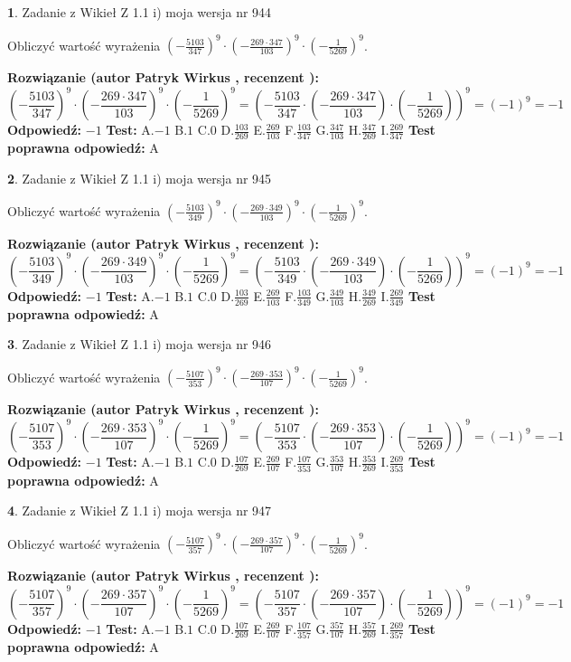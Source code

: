 \documentclass[12pt, a4paper]{article}
\theoremstyle{definition} %
\newtheorem{zad}{}
\newcommand{\zadStart}[1]{\begin{zad}#1\newline}
\newcommand{\zadStop}{\end{zad}}
\newcommand{\rozwStart}[2]{\noindent \textbf{Rozwiązanie (autor #1 , recenzent #2): }\newline}
\newcommand{\rozwStop}{\newline}
\newcommand{\odpStart}{\noindent \textbf{Odpowiedź:}\newline}
\newcommand{\odpStop}{\newline}
\newcommand{\testStart}{\noindent \textbf{Test:}\newline}
\newcommand{\testStop}{\newline}
\newcommand{\kluczStart}{\noindent \textbf{Test poprawna odpowiedź:}\newline}
\newcommand{\kluczStop}{\newline}
\begin{document}
\zadStart{Zadanie z Wikieł Z 1.1 i) moja wersja nr 944}

Obliczyć wartość wyrażenia $(-\frac{5103}{347})^{9} \cdot (-\frac{269 \cdot 347}{103})^{9} \cdot (-\frac{1}{5269})^{9}$.
\zadStop
\rozwStart{Patryk Wirkus}{}
$$(-\frac{5103}{347})^{9} \cdot (-\frac{269 \cdot 347}{103})^{9} \cdot (-\frac{1}{5269})^{9} = (-\frac{5103}{347} \cdot (-\frac{269 \cdot 347}{103}) \cdot (-\frac{1}{5269}))^{9} = (-1)^{9} = -1$$
\rozwStop
\odpStart
$-1$
\odpStop
\testStart
A.$-1$ B.$1$ C.$0$ D.$\frac{103}{269}$ E.$\frac{269}{103}$
F.$\frac{103}{347}$ G.$\frac{347}{103}$
H.$\frac{347}{269}$
I.$\frac{269}{347}$
\testStop
\kluczStart
A
\kluczStop



\zadStart{Zadanie z Wikieł Z 1.1 i) moja wersja nr 945}

Obliczyć wartość wyrażenia $(-\frac{5103}{349})^{9} \cdot (-\frac{269 \cdot 349}{103})^{9} \cdot (-\frac{1}{5269})^{9}$.
\zadStop
\rozwStart{Patryk Wirkus}{}
$$(-\frac{5103}{349})^{9} \cdot (-\frac{269 \cdot 349}{103})^{9} \cdot (-\frac{1}{5269})^{9} = (-\frac{5103}{349} \cdot (-\frac{269 \cdot 349}{103}) \cdot (-\frac{1}{5269}))^{9} = (-1)^{9} = -1$$
\rozwStop
\odpStart
$-1$
\odpStop
\testStart
A.$-1$ B.$1$ C.$0$ D.$\frac{103}{269}$ E.$\frac{269}{103}$
F.$\frac{103}{349}$ G.$\frac{349}{103}$
H.$\frac{349}{269}$
I.$\frac{269}{349}$
\testStop
\kluczStart
A
\kluczStop



\zadStart{Zadanie z Wikieł Z 1.1 i) moja wersja nr 946}

Obliczyć wartość wyrażenia $(-\frac{5107}{353})^{9} \cdot (-\frac{269 \cdot 353}{107})^{9} \cdot (-\frac{1}{5269})^{9}$.
\zadStop
\rozwStart{Patryk Wirkus}{}
$$(-\frac{5107}{353})^{9} \cdot (-\frac{269 \cdot 353}{107})^{9} \cdot (-\frac{1}{5269})^{9} = (-\frac{5107}{353} \cdot (-\frac{269 \cdot 353}{107}) \cdot (-\frac{1}{5269}))^{9} = (-1)^{9} = -1$$
\rozwStop
\odpStart
$-1$
\odpStop
\testStart
A.$-1$ B.$1$ C.$0$ D.$\frac{107}{269}$ E.$\frac{269}{107}$
F.$\frac{107}{353}$ G.$\frac{353}{107}$
H.$\frac{353}{269}$
I.$\frac{269}{353}$
\testStop
\kluczStart
A
\kluczStop



\zadStart{Zadanie z Wikieł Z 1.1 i) moja wersja nr 947}

Obliczyć wartość wyrażenia $(-\frac{5107}{357})^{9} \cdot (-\frac{269 \cdot 357}{107})^{9} \cdot (-\frac{1}{5269})^{9}$.
\zadStop
\rozwStart{Patryk Wirkus}{}
$$(-\frac{5107}{357})^{9} \cdot (-\frac{269 \cdot 357}{107})^{9} \cdot (-\frac{1}{5269})^{9} = (-\frac{5107}{357} \cdot (-\frac{269 \cdot 357}{107}) \cdot (-\frac{1}{5269}))^{9} = (-1)^{9} = -1$$
\rozwStop
\odpStart
$-1$
\odpStop
\testStart
A.$-1$ B.$1$ C.$0$ D.$\frac{107}{269}$ E.$\frac{269}{107}$
F.$\frac{107}{357}$ G.$\frac{357}{107}$
H.$\frac{357}{269}$
I.$\frac{269}{357}$
\testStop
\kluczStart
A
\kluczStop
\end{document}
